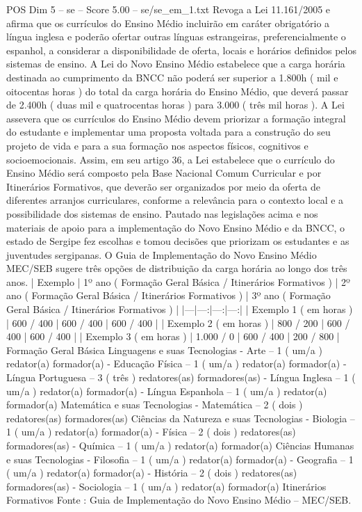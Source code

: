 \begin{textsample}{POS Dim 5 – se – Score 5.00 – se/se\_em\_1.txt}
Revoga a Lei 11.161/2005 e afirma que os currículos do Ensino Médio incluirão em caráter obrigatório a língua inglesa e poderão ofertar outras línguas estrangeiras, preferencialmente o espanhol, a considerar a disponibilidade de oferta, locais e horários definidos pelos sistemas de ensino.
A Lei do Novo Ensino Médio estabelece que a carga horária destinada ao cumprimento da BNCC não poderá ser superior a 1.800h ( mil e oitocentas horas ) do total da carga horária do Ensino Médio, que deverá passar de 2.400h ( duas mil e quatrocentas horas ) para 3.000 ( três mil horas ).
A Lei assevera que os currículos do Ensino Médio devem priorizar a formação integral do estudante e implementar uma proposta voltada para a construção do seu projeto de vida e para a sua formação nos aspectos físicos, cognitivos e socioemocionais.
Assim, em seu artigo 36, a Lei estabelece que o currículo do Ensino Médio será composto pela Base Nacional Comum Curricular e por Itinerários Formativos, que deverão ser organizados por meio da oferta de diferentes arranjos curriculares, conforme a relevância para o contexto local e a possibilidade dos sistemas de ensino.
Pautado nas legislações acima e nos materiais de apoio para a implementação do Novo Ensino Médio e da BNCC, o estado de Sergipe fez escolhas e tomou decisões que priorizam os estudantes e as juventudes sergipanas.
O Guia de Implementação do Novo Ensino Médio MEC/SEB sugere três opções de distribuição da carga horária ao longo dos três anos. | Exemplo | 1º ano ( Formação Geral Básica / Itinerários Formativos ) | 2º ano ( Formação Geral Básica / Itinerários Formativos ) | 3º ano ( Formação Geral Básica / Itinerários Formativos ) | |---|---:|---:|---:| | Exemplo 1 ( em horas ) | 600 / 400 | 600 / 400 | 600 / 400 | | Exemplo 2 ( em horas ) | 800 / 200 | 600 / 400 | 600 / 400 | | Exemplo 3 ( em horas ) | 1.000 / 0 | 600 / 400 | 200 / 800 | Formação Geral Básica Linguagens e suas Tecnologias - Arte – 1 ( um/a ) redator(a) formador(a) - Educação Física – 1 ( um/a ) redator(a) formador(a) - Língua Portuguesa – 3 ( três ) redatores(as) formadores(as) - Língua Inglesa – 1 ( um/a ) redator(a) formador(a) - Língua Espanhola – 1 ( um/a ) redator(a) formador(a) Matemática e suas Tecnologias - Matemática – 2 ( dois ) redatores(as) formadores(as) Ciências da Natureza e suas Tecnologias - Biologia – 1 ( um/a ) redator(a) formador(a) - Física – 2 ( dois ) redatores(as) formadores(as) - Química – 1 ( um/a ) redator(a) formador(a) Ciências Humanas e suas Tecnologias - Filosofia – 1 ( um/a ) redator(a) formador(a) - Geografia – 1 ( um/a ) redator(a) formador(a) - História – 2 ( dois ) redatores(as) formadores(as) - Sociologia – 1 ( um/a ) redator(a) formador(a) Itinerários Formativos Fonte : Guia de Implementação do Novo Ensino Médio – MEC/SEB.

\end{textsample}

